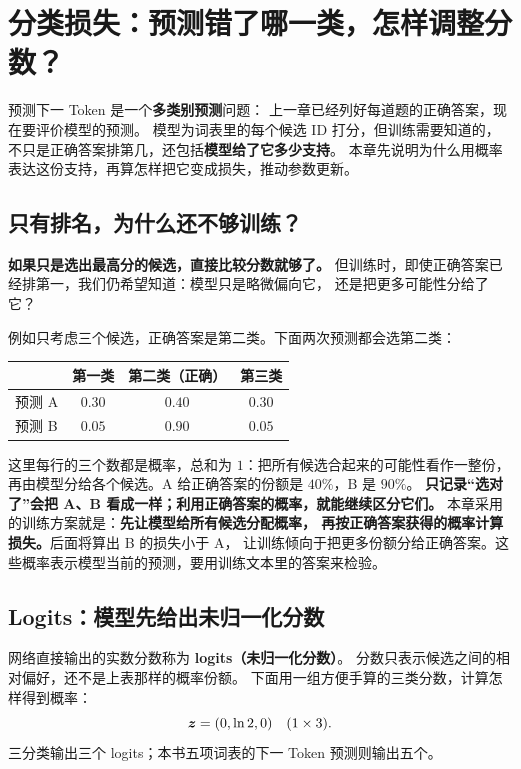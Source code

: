 \chapterrule
\section{分类损失：预测错了哪一类，怎样调整分数？}
\label{intro:classification-loss}

预测下一 Token 是一个\textbf{多类别预测}问题：
上一章已经列好每道题的正确答案，现在要评价模型的预测。
模型为词表里的每个候选 ID 打分，但训练需要知道的，
不只是正确答案排第几，还包括\textbf{模型给了它多少支持}。
本章先说明为什么用概率表达这份支持，再算怎样把它变成损失，推动参数更新。

\subsection{只有排名，为什么还不够训练？}

\textbf{如果只是选出最高分的候选，直接比较分数就够了。}
但训练时，即使正确答案已经排第一，我们仍希望知道：模型只是略微偏向它，
还是把更多可能性分给了它？

例如只考虑三个候选，正确答案是第二类。下面两次预测都会选第二类：
\begin{center}\small
{}
\begin{tabular}{@{}lccc@{}}
\toprule
 & 第一类 & 第二类（正确） & 第三类\\\midrule
预测 A & $0.30$ & $0.40$ & $0.30$\\
预测 B & $0.05$ & $0.90$ & $0.05$\\
\bottomrule
\end{tabular}
\end{center}
这里每行的三个数都是概率，总和为 $1$：把所有候选合起来的可能性看作一整份，
再由模型分给各个候选。A 给正确答案的份额是 $40\%$，B 是 $90\%$。
\textbf{只记录“选对了”会把 A、B 看成一样；利用正确答案的概率，就能继续区分它们。}
本章采用的训练方案就是：\textbf{先让模型给所有候选分配概率，
再按正确答案获得的概率计算损失。}后面将算出 B 的损失小于 A，
让训练倾向于把更多份额分给正确答案。这些概率表示模型当前的预测，要用训练文本里的答案来检验。

\subsection{Logits：模型先给出未归一化分数}
\label{concept:logits}
网络直接输出的实数分数称为 \textbf{logits（未归一化分数）}。
分数只表示候选之间的相对偏好，还不是上表那样的概率份额。
下面用一组方便手算的三类分数，计算怎样得到概率：
\[
\boldsymbol{z}=(0,\ln 2,0)\quad(1\times3).
\]
三分类输出三个 logits；本书五项词表的下一 Token 预测则输出五个。

